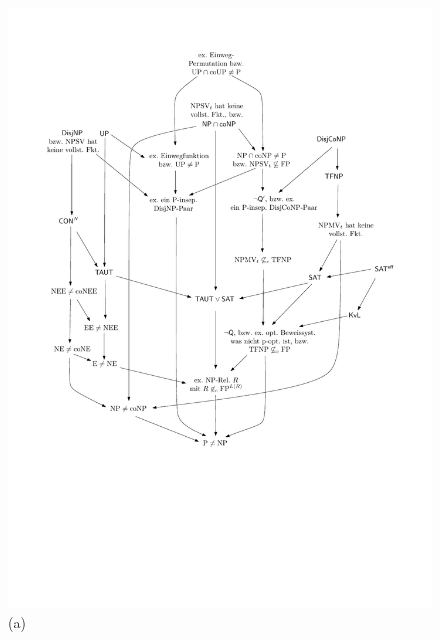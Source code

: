 \begin{figure}[t]
    \begin{minipage}[t][8cm][t]{\textwidth}
    \centering\includegraphics[page=3]{figures.pdf}\\\smallskip
    (a)\bigskip


\end{minipage}
\end{figure}
